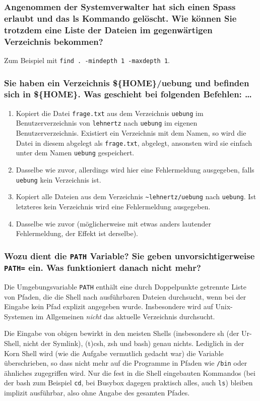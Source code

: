 \subsubsection*{Angenommen der Systemverwalter hat sich einen Spass erlaubt und
das ls Kommando gel\"oscht. Wie k\"onnen Sie trotzdem eine Liste der Dateien im
gegenw\"artigen Verzeichnis bekommen?}
Zum Beispiel mit \lstinline'find . -mindepth 1 -maxdepth 1'.

\subsubsection*{Sie haben ein Verzeichnis \$\{HOME\}/uebung und befinden sich in
\$\{HOME\}.  Was geschieht bei folgenden Befehlen: \dots}
\begin{enumerate}
    \item Kopiert die Datei \verb'frage.txt' aus dem Verzeichnis
        \verb'uebung' im Benutzerverzeichnis von \verb'lehnertz' nach
        \verb'uebung' im eigenen Benutzerverzeichnis. Existiert ein
        Verzeichnis mit dem Namen, so wird die Datei in diesem abgelegt
        als \verb'frage.txt', abgelegt, ansonsten wird sie einfach unter
        dem Namen \verb'uebung' gespeichert.
    \item Dasselbe wie zuvor, allerdings wird hier eine Fehlermeldung
        ausgegeben, falls \verb'uebung' kein Verzeichnis ist.
    \item Kopiert alle Dateien aus dem Verzeichnis
        \verb'~lehnertz/uebung' nach \verb'uebung'. Ist letzteres kein
        Verzeichnis wird eine Fehlermeldung ausgegeben.
    \item Dasselbe wie zuvor (m\"oglicherweise mit etwas anders
        lautender Fehlermeldung, der Effekt ist derselbe).
\end{enumerate}

\subsubsection*{Wozu dient die \lstinline'PATH' Variable? Sie geben
unvorsichtigerweise \lstinline'PATH=' ein. Was funktioniert danach nicht mehr?}
Die Umgebungsvariable \lstinline'PATH' enthält eine durch Doppelpunkte getrennte
Liste von Pfaden, die die Shell nach ausführbaren Dateien durchsucht, wenn bei
der Eingabe kein Pfad explizit angegeben wurde. Insbesondere wird auf
Unix-Systemen im Allgemeinen \emph{nicht} das aktuelle Verzeichnis durchsucht.

Die Eingabe von obigen bewirkt in den meisten Shells (insbesondere sh (der
Ur-Shell, nicht der Symlink), (t)csh, zsh und bash) genau nichts. Lediglich in
der Korn Shell wird (wie die Aufgabe vermutlich gedacht war) die Variable
überschrieben, so dass nicht mehr auf die Programme in Pfaden wie \verb'/bin'
oder ähnliches zugegriffen wird. Nur die fest in die Shell eingebauten Kommandos
(bei der bash zum Beispiel \verb'cd', bei Busybox dagegen praktisch alles, auch
\verb'ls') bleiben implizit ausführbar, also ohne Angabe des gesamten Pfades.


